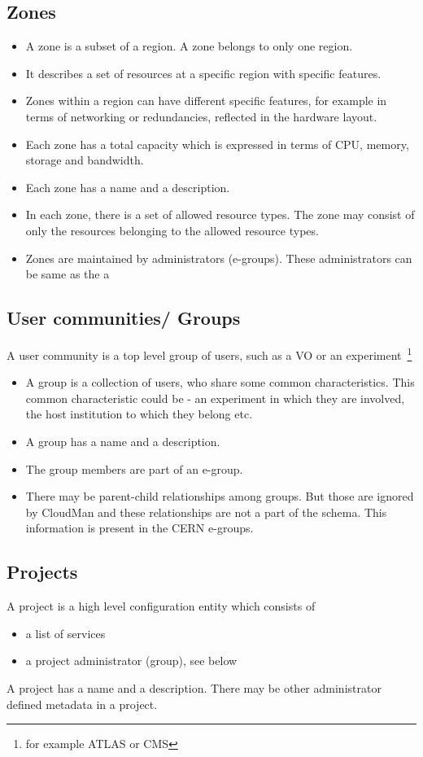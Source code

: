 \documentclass[12pt]{article}
\begin{document}
\subsection{Zones}
\begin{itemize}
\item A zone is a subset of a region. A zone belongs to only one region.
\item It describes a set of resources at a specific region with specific features.
\item Zones within a region can have different specific features, for example in terms of networking or redundancies, reflected in the hardware layout.
\item Each zone has a total capacity which is expressed in terms of CPU, memory, storage and bandwidth.
\item Each zone has a name and a description.
\item In each zone, there is a set of allowed resource types. The zone may consist of only the resources belonging to the allowed resource types.
\item Zones are maintained by administrators (e-groups). These administrators can be same as the a 
\end{itemize}

\subsection{User communities/ Groups}
A user community is a top level group of users, such as a VO or an experiment~\footnote{for example ATLAS or CMS}
\begin{itemize}
\item A group is a collection of users, who share some common characteristics. This common characteristic could be - an experiment in which they are involved, the host institution to which they belong etc.
\item A group has a name and a description.
\item The group members are part of an e-group.
\item There may be parent-child relationships among groups. But those are ignored by CloudMan and these relationships are not a part of the schema. This information is present in the CERN e-groups.
\end{itemize}

\subsection{Projects}
A project is a high level configuration entity which consists of
\begin{itemize}
\item a list of services
\item a project administrator (group), see below
\end{itemize}
A project has a name and a description. There may be other administrator defined metadata in a project.
\end{document}
